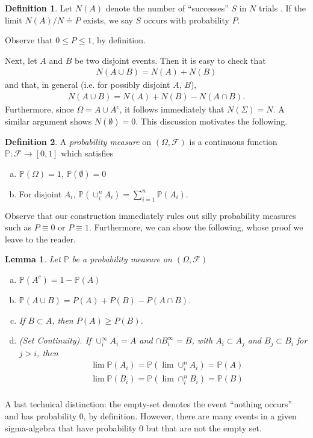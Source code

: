 \documentclass[12pt]{article}
\newcommand{\filter}{\mathcal{F}}
\newcommand{\prob}{\mathbb{P}}
\theoremstyle{plain}
\newtheorem{lemma}[theorem]{Lemma}
\theoremstyle{definition}
\newtheorem*{definition}{Definition}
\theoremstyle{remark}
\numberwithin{equation}{section}  %
\begin{document}
\begin{definition}
Let $N(A)$ denote the number of ``successes'' $S$ in $N$ trials . If the
limit $N(A)/N \doteq P$ exists, we say $S$ occurs with probability $P$.
\end{definition}
Observe that $ 0 \le P \le 1$, by definition.

Next, let $A$ and $B$ be two disjoint events. Then
it is easy to check that
\begin{align*}
N(A \cup B) = N(A) + N(B)
\end{align*}
and that, in general (i.e. for possibly disjoint $A$, $B$),
\begin{align*}
N(A \cup B) = N(A) + N(B) - N(A \cap B).
\end{align*}
Furthermore, since $\Omega = A \cup A^c$, it follows immediately
that $N(\Sigma) = N$. A similar argument shows $N(\emptyset) = 0$.
This discussion motivates the following.
\begin{definition}
A \emph{probability measure} on $(\Omega, \filter)$ is a continuous function
$\prob: \filter \to [0,1]$ which satisfies
\begin{enumerate}[a)]
	\item
$\prob(\Omega) = 1$, $\prob(\emptyset) = 0$
\item
For disjoint $A_i$, $\prob(\cup_i^n A_i) = \sum_{i = 1}^n \prob(A_i)$.
\end{enumerate}
\end{definition}
Observe that our construction immediately rules out silly probability
measures such as $P \equiv 0$ or $P \equiv 1$. Furthermore,
we can show the following, whose proof we leave to the reader.
\begin{lemma}
Let $\prob$ be a probability measure on $(\Omega, \filter)$
\begin{enumerate}[a)]
\item $\prob(A^c) = 1 - \prob(A)$
\item $\prob(A \cup B) = P(A) + P(B) - P(A \cap B)$.
\item If $B \subset A$, then $P(A) \ge P(B)$.
\item \emph{(Set Continuity)}.
If $\cup_i^\infty A_i = A$ and
$\cap B_i^\infty = B$, with $A_i \subset A_j$ and $B_j \subset B_i$ for $j > i$,
then
\begin{align*}
& \lim \prob(A_i) = \prob(\lim \cup_i^n A_i) = \prob(A) \\
& \lim \prob(B_i) = \prob(\lim \cap_i^n B_i) = \prob(B) \\
\end{align*}
\end{enumerate}
\end{lemma}
A last technical distinction: the empty-set denotes the event ``nothing
occurs'' and has probability $0$, by definition. However, there are many
events in a given sigma-algebra that have probability $0$ but that are not the
empty set.
\end{document}
